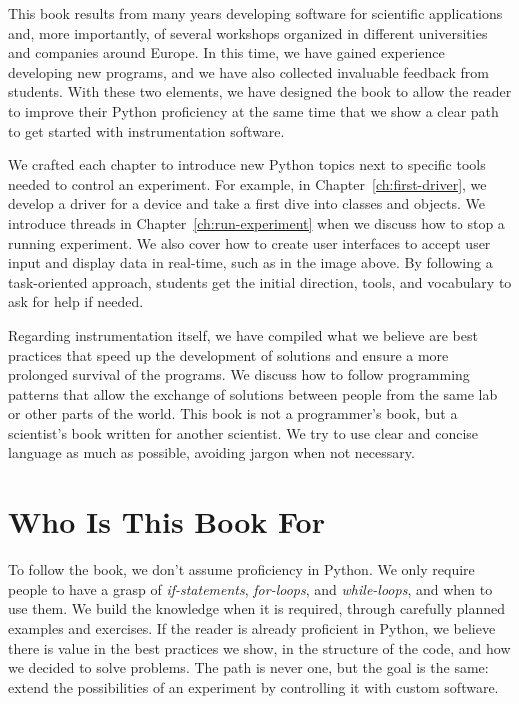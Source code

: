 This book results from many years developing software for scientific applications and, more importantly, of several workshops organized in different universities and companies around Europe. In this time, we have gained experience developing new programs, and we have also collected invaluable feedback from students. With these two elements, we have designed the book to allow the reader to improve their Python proficiency at the same time that we show a clear path to get started with instrumentation software.

We crafted each chapter to introduce new Python topics next to specific tools needed to control an experiment. For example, in Chapter~\ref{ch:first-driver}, we develop a driver for a device and take a first dive into classes and objects. We introduce threads in Chapter~\ref{ch:run-experiment} when we discuss how to stop a running experiment. We also cover how to create user interfaces to accept user input and display data in real-time, such as in the image above. By following a task-oriented approach, students get the initial direction, tools, and vocabulary to ask for help if needed.

Regarding instrumentation itself, we have compiled what we believe are best practices that speed up the development of solutions and ensure a more prolonged survival of the programs. We discuss how to follow programming patterns that allow the exchange of solutions between people from the same lab or other parts of the world. This book is not a programmer's book, but a scientist's book written for another scientist. We try to use clear and concise language as much as possible, avoiding jargon when not necessary.

\section{Who Is This Book For}\label{sec:who-can-read-this-book}
To follow the book, we don't assume proficiency in Python. We only require people to have a grasp of \textit{if-statements}, \textit{for-loops}, and \textit{while-loops}, and when to use them. We build the knowledge when it is required, through carefully planned examples and exercises. If the reader is already proficient in Python, we believe there is value in the best practices we show, in the structure of the code, and how we decided to solve problems. The path is never one, but the goal is the same: extend the possibilities of an experiment by controlling it with custom software.

